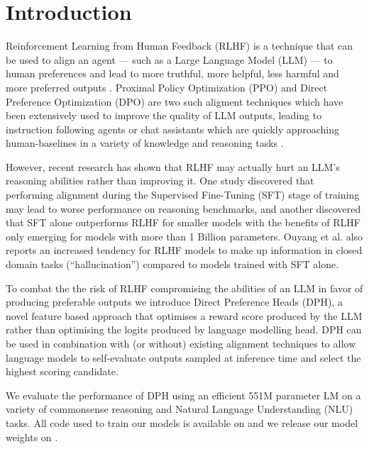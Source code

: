 \section{Introduction}
Reinforcement Learning from Human Feedback (RLHF) is a technique that can be used to align an agent --- such as a Large Language Model (LLM) --- to human preferences and lead to more truthful, more helpful, less harmful and more preferred outputs \cite{ouyang2022training}. Proximal Policy Optimization (PPO) \cite{schulman2017proximal} and Direct Preference Optimization (DPO) \cite{rafailov2023direct} are two such aligment techniques which have been extensively used to improve the quality of LLM outputs, leading to instruction following agents or chat assistants which are quickly approaching human-baselines in a variety of knowledge and reasoning tasks \cite{open-llm-leaderboard, clark2018think, zellers2019hellaswag, hendrycks2021measuring, lin2022truthfulqa, DBLP:journals/corr/abs-1907-10641, DBLP:journals/corr/abs-2110-14168}.

However, recent research has shown that RLHF may actually hurt an LLM's reasoning abilities rather than improving it. One study \cite{bekbayev2023poison} discovered that performing alignment during the Supervised Fine-Tuning (SFT) stage of training may lead to worse performance on reasoning benchmarks, and another \cite{bai2022training} discovered that SFT alone outperforms RLHF for smaller models with the benefits of RLHF only emerging for models with more than 1 Billion parameters. Ouyang et al. \cite{ouyang2022training} also reports an increased tendency for RLHF models to make up information in closed domain tasks (``hallucination'') compared to models trained with SFT alone.

To combat the the risk of RLHF compromising the abilities of an LLM in favor of producing preferable outputs we introduce Direct Preference Heads (DPH), a novel feature based approach that optimises a reward score produced by the LLM rather than optimising the logits produced by language modelling head. DPH can be used in combination with (or without) existing alignment techniques to allow language models to self-evaluate outputs sampled at inference time and select the highest scoring candidate.

We evaluate the performance of DPH using an efficient 551M parameter LM on a variety of commonsense reasoning and Natural Language Understanding (NLU) tasks. All code used to train our models is available on  and we release our model weights on .